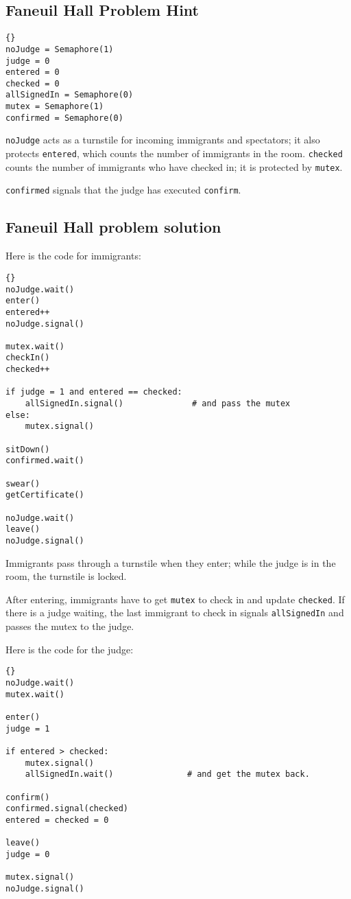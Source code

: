 \documentclass{book}
\newcommand{\clearemptydoublepage}{\newpage\cleardoublepage}
\begin{document}
\clearemptydoublepage
\subsection {Faneuil Hall Problem Hint}

\begin{lstlisting}[title={Faneuil Hall problem hint}]{}
noJudge = Semaphore(1)
judge = 0
entered = 0
checked = 0
allSignedIn = Semaphore(0)
mutex = Semaphore(1)
confirmed = Semaphore(0)
\end{lstlisting}

{\tt noJudge} acts as a turnstile for incoming immigrants and
spectators; it also protects {\tt entered}, which counts the
number of immigrants in the room.  {\tt checked} counts the
number of immigrants who have checked in; it is protected by
{\tt mutex}.

{\tt confirmed} signals that the judge has executed {\tt confirm}.


\clearemptydoublepage
\subsection {Faneuil Hall problem solution}

Here is the code for immigrants:

\begin{lstlisting}[title={Faneuil Hall problem solution (immigrant)}]{}
noJudge.wait()
enter()
entered++
noJudge.signal()

mutex.wait()
checkIn()
checked++

if judge = 1 and entered == checked:
    allSignedIn.signal()              # and pass the mutex
else:
    mutex.signal()

sitDown()
confirmed.wait()

swear()
getCertificate()

noJudge.wait()
leave()
noJudge.signal()
\end{lstlisting}

Immigrants pass through a turnstile when they enter; while the
judge is in the room, the turnstile is locked.

After entering, immigrants have to get {\tt mutex} to check 
in and update {\tt checked}.  If there is a judge waiting, the
last immigrant to check in signals {\tt allSignedIn} and passes
the mutex to the judge.

Here is the code for the judge:

\begin{lstlisting}[title={Faneuil Hall problem solution (judge)}]{}
noJudge.wait()
mutex.wait()

enter()
judge = 1

if entered > checked:
    mutex.signal()
    allSignedIn.wait()               # and get the mutex back.

confirm()
confirmed.signal(checked)
entered = checked = 0

leave()
judge = 0

mutex.signal()
noJudge.signal()
\end{lstlisting}
\end{document}
